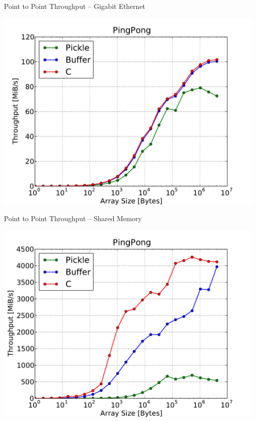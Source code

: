 \begin{frame}
  \begin{center}
    Point to Point Throughput -- Gigabit Ethernet
  \end{center}
  \includegraphics[scale=0.5]{PingPong_GE.pdf}
\end{frame}
\begin{frame}
  \begin{center}
    Point to Point Throughput -- Shared Memory
  \end{center}
  \includegraphics[scale=0.5]{PingPong_SM.pdf}
\end{frame}

